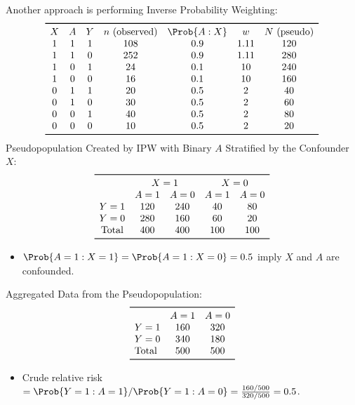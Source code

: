\documentclass[oneside]{book}\usepackage[]{graphicx}\usepackage[svgnames]{xcolor}
\providecommand\given{} %
\renewcommand\given{\nonscript\:\delimsize\vert\nonscript\:\mathopen{}}%
\renewcommand\given{\nonscript\:\delimsize\vert\nonscript\:\mathopen{}}%
\renewcommand\given{\nonscript\:\delimsize\vert\nonscript\:\mathopen{}}%
\renewcommand\given{\nonscript\:\delimsize\vert\nonscript\:\mathopen{}}%
\renewcommand\given{\nonscript\:\delimsize\vert\nonscript\:\mathopen{}}%
\renewcommand\given{\nonscript\:\delimsize\vert\nonscript\:\mathopen{}}%
\renewcommand\given{\nonscript\:\delimsize\vert\nonscript\:\mathopen{}}%
\renewcommand\given{\nonscript\:\delimsize\vert\nonscript\:\mathopen{}}%
\renewcommand\given{\nonscript\:\delimsize\vert\nonscript\:\mathopen{}}%
\renewcommand\given{\nonscript\:\delimsize\vert\nonscript\:\mathopen{}}%
\renewcommand\given{\nonscript\:\delimsize\vert\nonscript\:\mathopen{}}%
\renewcommand\given{\nonscript\:\delimsize\vert\nonscript\:\mathopen{}}%
\renewcommand\given{\nonscript\:\delimsize\vert\nonscript\:\mathopen{}}%
\renewcommand\given{\nonscript\:\delimsize\vert\nonscript\:\mathopen{}}%
\renewcommand\given{:}
\begin{document}
Another approach is performing Inverse Probability Weighting:
\[ \begin{array}{ccccccc}
            \toprule
            X & A & Y & n~\text{(observed)} & \Prob{A\given X} & w    & N~\text{(pseudo)} \\
            1 & 1 & 1 & 108                 & 0.9              & 1.11 & 120               \\
            1 & 1 & 0 & 252                 & 0.9              & 1.11 & 280               \\
            1 & 0 & 1 & 24                  & 0.1              & 10   & 240               \\
            1 & 0 & 0 & 16                  & 0.1              & 10   & 160               \\
            0 & 1 & 1 & 20                  & 0.5              & 2    & 40                \\
            0 & 1 & 0 & 30                  & 0.5              & 2    & 60                \\
            0 & 0 & 1 & 40                  & 0.5              & 2    & 80                \\
            0 & 0 & 0 & 10                  & 0.5              & 2    & 20                \\
            \bottomrule
      \end{array} \]
Pseudopopulation Created by IPW with Binary $A$ Stratified by the
Confounder $X$:
\[ \begin{array}{ccccc}
            \toprule
                         & \multicolumn{2}{c}{X=1} & \multicolumn{2}{c}{X=0}             \\
                         & A=1                     & A=0                     & A=1 & A=0 \\
            Y=1          & 120                     & 240                     & 40  & 80  \\
            Y=0          & 280                     & 160                     & 60  & 20  \\
            \text{Total} & 400                     & 400                     & 100 & 100 \\
            \bottomrule
      \end{array} \]
\begin{itemize}
      \item $ \Prob{A=1\given X=1}= \Prob{A=1\given X=0}=0.5 $ imply $ X $ and $ A $ are confounded.
\end{itemize}
Aggregated Data from the Pseudopopulation:
\[ \begin{array}{lcc}
            \toprule
                         & A=1 & A=0 \\
            Y=1          & 160 & 320 \\
            Y=0          & 340 & 180 \\
            \text{Total} & 500 & 500 \\
            \bottomrule
      \end{array} \]
\begin{itemize}
      \item Crude relative risk $ =\Prob{Y=1\given A=1}/\Prob{Y=1\given A=0}=\frac{160/500}{320/500}=0.5 $.
\end{itemize}
\end{document}
